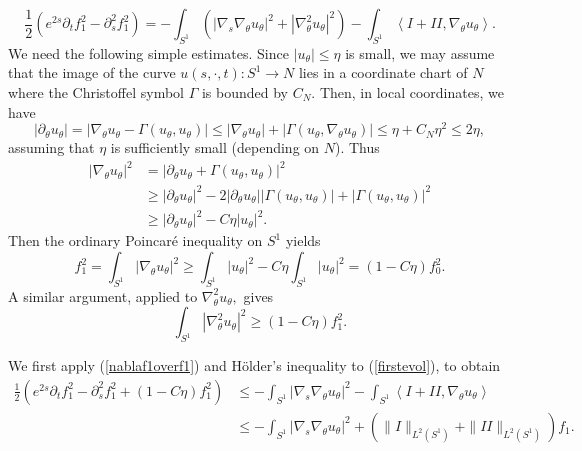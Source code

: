 \documentclass[12pt]{amsart}
\newcommand{\LA}{\left\langle}
\newcommand{\RA}{\right\rangle}
\theoremstyle{others}
\numberwithin{equation}{section}
\def\({\left(} \def\){\right)}
\newcommand{\Ga}{\Gamma}
\renewcommand{\th}{\theta}
\newcommand{\p}{\partial}
\newcommand{\n}{\nabla}
\begin{document}
\begin{equation}\label{firstevol}
\frac12 \left( e^{2s} \partial_t f_1^2 - \p_s^2f_1^2 \right) = - \int_{S^1}\( |\n_s \nabla_\theta u_{\th}|^2 + |\n_\theta^2 u_\theta|^2 \right) - \int_{S^1} \LA I + I\! I, \nabla_\theta u_\theta \RA.
\end{equation}
We need the following simple estimates. Since $|u_\th|\le \eta$ is small, we may assume that the image of the curve $u(s, \cdot, t):S^1\to N$ lies in a coordinate chart of $N$ where the Christoffel symbol $\Ga$ is bounded by $C_N$. Then, in local coordinates, we have
\[ |\p_\th u_\th| = |\n_\th u_\th - \Ga(u_\th, u_\th)| \le |\n_\th u_\th| + |\Ga(u_\th, \n_\th u_\th)| \le \eta + C_N \eta^2 \leq 2 \eta,\]
assuming that $\eta$ is sufficiently small (depending on $N$).
Thus
\[\begin{aligned}
  |\n_{\th} u_{\th}|^2&=|\p_\th u_\th +\Ga(u_\th, u_\th)|^2\\
  &\ge   |\p_\th u_\th|^2-2|\p_\th u_\th||\Ga(u_\th, u_\th)|+|\Ga(u_\th, u_\th)|^2\\
  &\ge  |\p_\th u_\th|^2-C \eta |u_\th|^2.
\end{aligned}\]
Then the ordinary Poincar\'e inequality on $S^1$ yields
\begin{equation}\label{f1overf_0}
f_1^2 =  \int_{S^1}|\n_{\th} u_{\th}|^2\ge  \int_{S^1}|u_\th|^2-C \eta \int_{S^1}|u_\th|^2=(1-C\eta )f_0^2.
\end{equation}
A similar argument, applied to $\nabla_\theta^2 u_\theta,$ gives
\begin{equation}\label{nablaf1overf1}
\int_{S^1}|\n_{\th}^2 u_{\th}|^2 \ge  (1-C\eta) f_1^2.
\end{equation}
\begin{comment}
Finally, by the Sobolev inequality on $S^1,$ we have
\begin{equation*}
\sup_{S^1} | u_\theta | \leq C \left( f_0 + f_1 \right) \leq C f_1.
\end{equation*}
\end{comment}
We first apply (\ref{nablaf1overf1}) and H\"older's inequality to (\ref{firstevol}), to obtain
\begin{equation}\label{secondevol}
\begin{split}
\frac12 \left( e^{2s} \partial_t f_1^2 - \p_s^2f_1^2 + (1 - C\eta) f_1^2 \right) & \leq - \int_{S^1} |\n_s \nabla_\theta u_{\th}|^2 - \int_{S^1} \LA I + II, \nabla_\theta u_\theta \RA \\
& \leq - \int_{S^1} |\n_s \nabla_\theta u_{\th}|^2 + \left( \|I\|_{L^2(S^1)} + \|II\|_{L^2(S^1)} \right) f_1.
\end{split}
\end{equation}
\end{document}
